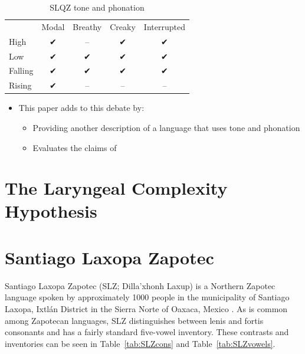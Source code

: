 \documentclass[12pt, letterpaper]{article}
\providecommand{\lsptoprule}{\midrule\toprule}
\providecommand{\lspbottomrule}{\bottomrule\midrule}
\begin{document}
\begin{table}[!ht]
	\centering
	\caption{SLQZ tone and phonation}
	\label{tab:SLQZ}
	\begin{tabular}{lcccc}
		\lsptoprule
						&	 Modal  & Breathy & Creaky & Interrupted \\
			High	& ✔︎ & -- & ✔︎ & ✔︎ \\
			Low & ✔︎ & ✔︎ & ✔︎ & ✔︎ \\
			Falling & ✔︎ & ✔︎ & ✔︎ & ✔︎ \\
			Rising & ✔︎ & -- & -- & -- \\
		\lspbottomrule
	\end{tabular}
\end{table}
\begin{itemize}
	\item This paper adds to this debate by:
	\begin{itemize}
		\item Providing another description of a language that uses tone and phonation
		\item Evaluates the claims of \citet{silvermanLaryngealComplexityOtomanguean1997}
	\end{itemize}
\end{itemize}

\section{The Laryngeal Complexity Hypothesis} \label{sec:Silverman}



\section{Santiago Laxopa Zapotec} \label{sec:SLZ}

Santiago Laxopa Zapotec (SLZ; Dilla'xhonh Laxup) is a Northern Zapotec language spoken by approximately 1000 people in the municipality of Santiago Laxopa, Ixtlán District in the Sierra Norte of Oaxaca, Mexico \citep{adlerAcousticsPhonationTypes2016,adlerDerivationVerbInitiality2018,foleyForbiddenCliticClusters2018,foleyExtendingPersonCaseConstraint2020}. As is common among Zapotecan languages, SLZ distinguishes between lenis and fortis consonants \citep[e.g.,][]{nellisFortisLenisCajonos1980,jaegerFortisLenisQuestion1983,uchiharaFortisLenisGlides2016} and has a fairly standard five-vowel inventory. These contrasts and inventories can be seen in Table~\ref{tab:SLZcons} and Table~\ref{tab:SLZvowels}.
\end{document}

